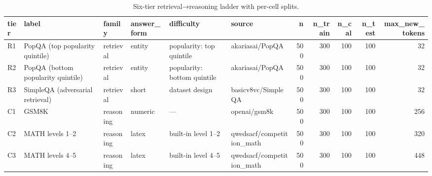 \begin{table}
\caption{Six-tier retrieval→reasoning ladder with per-cell splits.}
\label{tab:t1_dataset_composition}
\begin{tabular}{llllllrrrrr}
\toprule
tier & label & family & answer\_form & difficulty & source & n & n\_train & n\_cal & n\_test & max\_new\_tokens \\
\midrule
R1 & PopQA (top popularity quintile) & retrieval & entity & popularity: top quintile & akariasai/PopQA & 500 & 300 & 100 & 100 & 32 \\
R2 & PopQA (bottom popularity quintile) & retrieval & entity & popularity: bottom quintile & akariasai/PopQA & 500 & 300 & 100 & 100 & 32 \\
R3 & SimpleQA (adversarial retrieval) & retrieval & short & dataset design & basicv8vc/SimpleQA & 500 & 300 & 100 & 100 & 32 \\
C1 & GSM8K & reasoning & numeric & — & openai/gsm8k & 500 & 300 & 100 & 100 & 256 \\
C2 & MATH levels 1–2 & reasoning & latex & built-in level 1–2 & qwedsacf/competition\_math & 500 & 300 & 100 & 100 & 320 \\
C3 & MATH levels 4–5 & reasoning & latex & built-in level 4–5 & qwedsacf/competition\_math & 500 & 300 & 100 & 100 & 448 \\
\bottomrule
\end{tabular}
\end{table}
